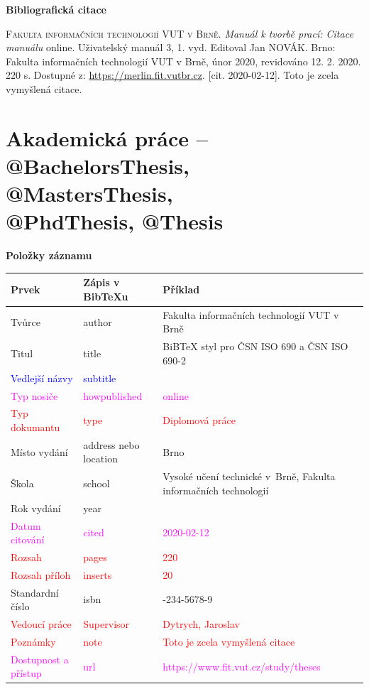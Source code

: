 \bigskip

\noindent \textbf{Bibliografická citace}

\medskip

\noindent \textsc{Fakulta informačních technologií VUT v Brně}. \textit{Manuál k tvorbě prací: Citace manuálu} online. Uživatelský manuál 3, 1. vyd. Editoval Jan NOVÁK.
Brno: Fakulta informačních technologií VUT v Brně, únor 2020, revidováno 12. 2. 2020. 220 s. Dostupné z: \url{https://merlin.fit.vutbr.cz}. [cit. 2020-02-12]. Toto je zcela vymyšlená citace.
\newpage
\section*{Akademická práce -- @BachelorsThesis, @MastersThesis, \\@PhdThesis, @Thesis}
\label{pr-thesis}
\noindent \textbf{Položky záznamu}

\medskip

\begin{tabularx}{0.95\linewidth}{X X >{\raggedright\arraybackslash}X}
   Prvek & Zápis v BibTeXu & Příklad\\\hline
   Tvůrce & author & Fakulta informačních technologií VUT v Brně\\
   Titul & title & BiBTeX styl pro ČSN ISO 690 a ČSN ISO 690-2\\
   \textcolor{blue}{Vedlejší názvy} & \textcolor{blue}{subtitle} & \\
   \textcolor{magenta}{Typ nosiče} & \textcolor{magenta}{howpublished} & \textcolor{magenta}{online}\\
   \textcolor{red}{Typ dokumantu} & \textcolor{red}{type} & \textcolor{red}{Diplomová práce}\\
   Místo vydání & address nebo location & Brno\\
   Škola & school & Vysoké učení technické v~Brně, Fakulta informačních technologií\\
   Rok vydání & year & 2020\\
   \textcolor{magenta}{Datum citování} & \textcolor{magenta}{cited} & \textcolor{magenta}{2020-02-12}\\
   \textcolor{red}{Rozsah} & \textcolor{red}{pages} & \textcolor{red}{220}\\
   \textcolor{red}{Rozsah příloh} & \textcolor{red}{inserts} & \textcolor{red}{20}\\
   Standardní číslo & isbn & 01-234-5678-9\\
   \textcolor{red}{Vedoucí práce} & \textcolor{red}{Supervisor} & \textcolor{red}{Dytrych, Jaroslav}\\
   \textcolor{red}{Poznámky} & \textcolor{red}{note} & \textcolor{red}{Toto je zcela vymyšlená citace}\\
   \textcolor{magenta}{Dostupnost a přístup} & \textcolor{magenta}{url} & \textcolor{magenta}{https://www.fit.vut.cz/\-study/theses}\\
\end{tabularx}

